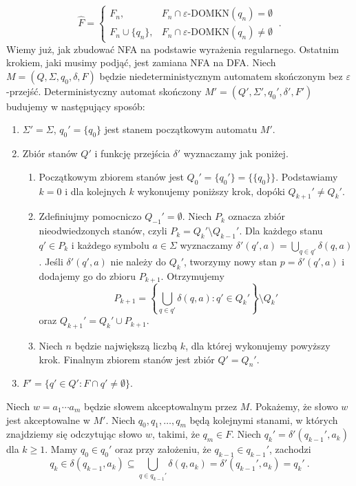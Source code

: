 $$\hat{F}=\left\{
\begin{array}{rl}
    F_n, & F_n\cap\varepsilon\text{-DOMKN}(q_n)=\emptyset\\
    F_n\cup\{q_n\}, & F_n\cap\varepsilon\text{-DOMKN}(q_n)\neq\emptyset
\end{array}
\right.~.$$
Wiemy już, jak zbudować NFA na podstawie wyrażenia regularnego. Ostatnim krokiem, jaki musimy podjąć, jest zamiana NFA na DFA. Niech $M=(Q,\Sigma,q_0,\delta,F)$ będzie niedeterministycznym automatem skończonym bez $\varepsilon$-przejść. Deterministyczny automat skończony $M'=(Q',\Sigma',q_0',\delta',F')$ budujemy w następujący sposób:
\begin{enumerate}
    \item $\Sigma'=\Sigma$, $q_0'=\{q_0\}$ jest stanem początkowym automatu $M'$.
    \item Zbiór stanów $Q'$ i funkcję przejścia $\delta'$ wyznaczamy jak poniżej.
    \begin{enumerate}
        \item Początkowym zbiorem stanów jest $Q_0'=\{q_0'\}=\{\{q_0\}\}$. Podstawiamy $k=0$ i dla kolejnych $k$ wykonujemy poniższy krok, dopóki $Q_{k+1}'\neq Q_k'$.
        \item Zdefiniujmy pomocniczo $Q_{-1}'=\emptyset$. Niech $P_k$ oznacza zbiór nieodwiedzonych stanów, czyli $P_k=Q_k'\setminus Q_{k-1}'$. Dla każdego stanu $q'\in P_k$ i każdego symbolu $a\in\Sigma$ wyznaczamy $\delta'(q',a)=\bigcup_{q\in q'}{\delta(q,a)}$. Jeśli $\delta'(q',a)$ nie należy do $Q_k'$, tworzymy nowy stan $p=\delta'(q',a)$ i dodajemy go do zbioru $P_{k+1}$. Otrzymujemy
        $$P_{k+1}=\left\{\bigcup_{q\in q'}{\delta(q,a)}: q'\in Q_k'\right\}\setminus Q_k'$$
        oraz $Q_{k+1}'=Q_k'\cup P_{k+1}$.
        \item Niech $n$ będzie największą liczbą $k$, dla której wykonujemy powyższy krok. Finalnym zbiorem stanów jest zbiór $Q'=Q_n'$.
    \end{enumerate}
    \item $F'=\{q'\in Q': F\cap q'\neq\emptyset\}$.
\end{enumerate}
Niech $w=a_1\dotsm a_m$ będzie słowem akceptowalnym przez $M$. Pokażemy, że słowo $w$ jest akceptowalne w $M'$. Niech $q_0,q_1,\dotsc,q_m$ będą kolejnymi stanami, w których znajdziemy się odczytując słowo $w$, takimi, że $q_m\in F$. Niech $q_k'=\delta'(q_{k-1}',a_k)$ dla $k\geq 1$. Mamy $q_0\in q_0'$ oraz przy założeniu, że $q_{k-1}\in q_{k-1}'$, zachodzi
$$q_k\in\delta(q_{k-1},a_k)\subseteq\bigcup_{q\in q_{k-1}'}{\delta(q,a_k)}=\delta'(q_{k-1}',a_k)=q_k'~.$$
